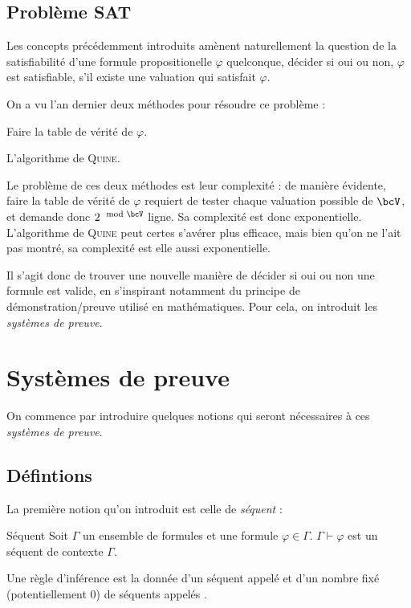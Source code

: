    \subsection{Problème SAT}
    
    Les concepts précédemment introduits amènent naturellement la question de la satisfiabilité d'une formule propositionelle $\varphi$ quelconque, \ie décider si oui ou non, $\varphi$ est satisfiable, \ie s'il existe une valuation qui satisfait $\varphi$.
    
    On a vu l'an dernier deux méthodes pour résoudre ce problème :
    \begin{enumerate}
        \itt Faire la table de vérité de $\varphi$.
        
        \itt L'algorithme de \textsc{Quine}.
    \end{enumerate}
    Le problème de ces deux méthodes est leur complexité : de manière évidente, faire la table de vérité de $\varphi$ requiert de tester chaque valuation possible de $\bcV$, et demande donc $2^{\mod{\bcV}}$ ligne. Sa complexité est donc exponentielle. L'algorithme de \textsc{Quine} peut certes s'avérer plus efficace, mais bien qu'on ne l'ait pas montré, sa complexité est elle aussi exponentielle.
    
    Il s'agit donc de trouver une nouvelle manière de décider si oui ou non une formule est valide, en s'inspirant notamment du principe de démonstration/preuve utilisé en mathématiques. Pour cela, on introduit les \textit{systèmes de preuve}.
    
    \section{Systèmes de preuve}
    
    On commence par introduire quelques notions qui seront nécessaires à ces \textit{systèmes de preuve}.
    
    \subsection{Défintions}
    
    La première notion qu'on introduit est celle de \textit{séquent} :
    
    \begin{definition}{Séquent}{}
        Soit $\Gamma$ un ensemble de formules et une formule $\varphi \in \Gamma$. $\Gamma \vdash \varphi$ est un séquent de contexte $\Gamma$.
        
        Une règle d'inférence est la donnée d'un séquent appelé  et d'un nombre fixé (potentiellement $0$) de séquents appelés .
    \end{definition}
    
